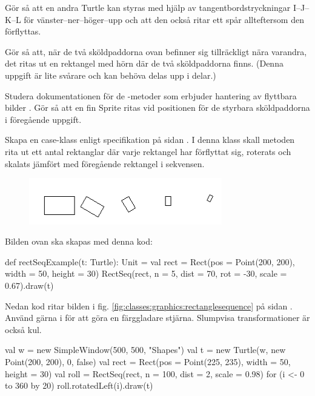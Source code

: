 \Subtask Gör så att en andra Turtle kan styras med hjälp av tangentbordstryckningar I--J--K--L för vänster--ner--höger--upp och att den också ritar ett spår allteftersom den förflyttas.

\Subtask Gör så att, när de två sköldpaddorna ovan befinner sig tillräckligt nära varandra, det ritas ut en rektangel med hörn där de två sköldpaddorna finns. (Denna uppgift är lite svårare och kan behöva delas upp i delar.)


\Task Studera dokumentationen för de -metoder som erbjuder hantering av flyttbara bilder . Gör så att en fin Sprite ritas vid positionen för de styrbara sköldpaddorna i föregående uppgift.


\Task Skapa en case-klass  enligt specifikation på sidan \pageref{code:classes:graphics:rectanglesequence}. I denna klass skall metoden  rita ut ett antal rektanglar där varje rektangel har förflyttat sig, roterats och skalats jämfört med föregående rektangel i sekvensen.

\begin{figure}[H]
\centering
\includegraphics[width=0.75\textwidth]{../img/turtle/RectSeq.png}
\end{figure}
\noindent Bilden ovan ska skapas med denna kod:
\begin{Code}
  def rectSeqExample(t: Turtle): Unit  = {
    val rect = Rect(pos = Point(200, 200), width = 50, height = 30)
    RectSeq(rect, n = 5, dist = 70, rot = -30, scale = 0.67).draw(t)
  }
\end{Code}

\noindent Nedan kod ritar bilden i fig. \ref{fig:classes:graphics:rectanglesequence} på sidan \pageref{fig:classes:graphics:rectanglesequence}. Använd gärna  i  för att göra en färggladare stjärna. Slumpvisa transformationer är också kul.

\begin{Code}
val w = new SimpleWindow(500, 500, "Shapes")
val t = new Turtle(w, new Point(200, 200), 0, false)
val rect = Rect(pos = Point(225, 235), width = 50, height = 30)
val roll = RectSeq(rect, n = 100, dist = 2, scale = 0.98)
for (i <- 0 to 360 by 20) roll.rotatedLeft(i).draw(t)
\end{Code}


